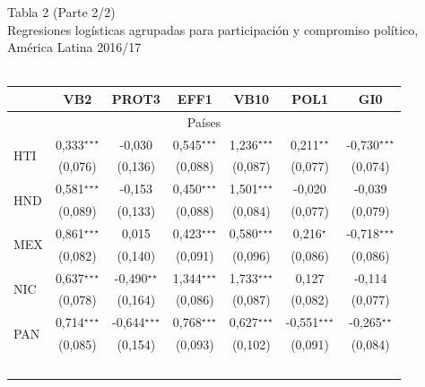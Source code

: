 \documentclass[a4paper]{tufte-handout}
\begin{document}
\begin{table}[h]
  \centering
  \selectfont
   \smallskip\noindent\small Tabla 2 (Parte 2/2) \\ Regresiones logísticas agrupadas para participación y compromiso político, América Latina 2016/17 \\~\\
  \begin{tabular}{l c c c c c c}
    \toprule
     & VB2 & PROT3 & EFF1 & VB10 & POL1 & GI0 \\ \midrule
    \multicolumn{7}{c}{Países} \\ \midrule
    \multirow{2}{*}{HTI} & 0,333$^\star$$^\star$$^\star$ & -0,030 & 0,545$^\star$$^\star$$^\star$ & 1,236$^\star$$^\star$$^\star$ & 0,211$^\star$$^\star$ & -0,730$^\star$$^\star$$^\star$ \\
    & {\scriptsize (0,076)} & {\scriptsize (0,136)} & {\scriptsize (0,088)} & {\scriptsize (0,087)} & {\scriptsize (0,077)} & {\scriptsize (0,074)} \\ 
    \multirow{2}{*}{HND} & 0,581$^\star$$^\star$$^\star$ & -0,153 & 0,450$^\star$$^\star$$^\star$ & 1,501$^\star$$^\star$$^\star$ & -0,020 & -0,039 \\
    & {\scriptsize (0,089)} & {\scriptsize (0,133)} & {\scriptsize (0,088)} & {\scriptsize (0,084)} & {\scriptsize (0,077)} & {\scriptsize (0,079)} \\
    \multirow{2}{*}{MEX} & 0,861$^\star$$^\star$$^\star$ & 0,015 & 0,423$^\star$$^\star$$^\star$ & 0,580$^\star$$^\star$$^\star$ & 0,216$^\star$ & -0,718$^\star$$^\star$$^\star$ \\
    & {\scriptsize (0,082)} & {\scriptsize (0,140)} & {\scriptsize (0,091)} & {\scriptsize (0,096)} & {\scriptsize (0,086)} & {\scriptsize (0,086)}\\
    \multirow{2}{*}{NIC} & 0,637$^\star$$^\star$$^\star$ & -0,490$^\star$$^\star$ & 1,344$^\star$$^\star$$^\star$ & 1,733$^\star$$^\star$$^\star$ & 0,127 & -0,114\\
    & {\scriptsize (0,078)} & {\scriptsize (0,164)} & {\scriptsize (0,086)} & {\scriptsize (0,087)} & {\scriptsize (0,082)} & {\scriptsize (0,077)} \\
    \multirow{2}{*}{PAN} & 0,714$^\star$$^\star$$^\star$ & -0,644$^\star$$^\star$$^\star$ & 0,768$^\star$$^\star$$^\star$ & 0,627$^\star$$^\star$$^\star$ & -0,551$^\star$$^\star$$^\star$ & -0,265$^\star$$^\star$ \\
    & {\scriptsize (0,085)} & {\scriptsize (0,154)} & {\scriptsize (0,093)} & {\scriptsize (0,102)} & {\scriptsize (0,091)} & {\scriptsize (0,084)} \\
$$
\end{tabular}
\end{table}
\end{document}
